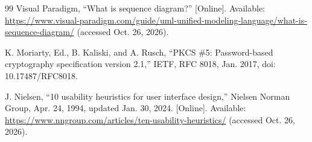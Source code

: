 \begin{thebibliography}{99}
 Visual Paradigm, ``What is sequence diagram?'' [Online]. Available: \url{https://www.visual-paradigm.com/guide/uml-unified-modeling-language/what-is-sequence-diagram/} (accessed Oct. 26, 2026).

 K. Moriarty, Ed., B. Kaliski, and A. Rusch, ``PKCS \#5: Password-based cryptography specification version 2.1,'' IETF, RFC 8018, Jan. 2017, doi: 10.17487/RFC8018.

 J. Nielsen, ``10 usability heuristics for user interface design,'' Nielsen Norman Group, Apr. 24, 1994, updated Jan. 30, 2024. [Online]. Available: \url{https://www.nngroup.com/articles/ten-usability-heuristics/} (accessed Oct. 26, 2026).

\end{thebibliography}
